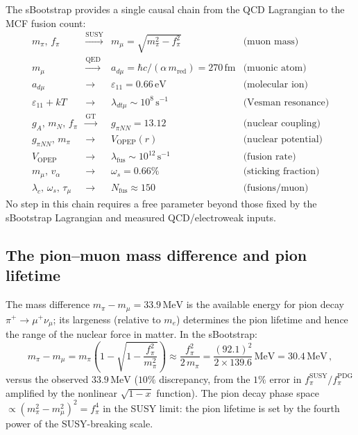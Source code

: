 \documentclass[12pt,a4paper]{article}
\newcommand{\MeV}{\,\text{MeV}}
\newcommand{\eV}{\,\text{eV}}
\newcommand{\fpi}{f_\pi}
\begin{document}
The sBootstrap provides a single causal chain from the QCD Lagrangian
to the MCF fusion count:
\begin{equation}
\begin{array}{rcll}
  m_\pi,\,\fpi & \xrightarrow{\text{SUSY}} & m_\mu = \sqrt{m_\pi^2 - \fpi^2}
    & \text{(muon mass)} \\
  m_\mu & \xrightarrow{\text{QED}} & a_{d\mu} = \hbar c/(\alpha\,m_{\text{red}})
    = 270\,\text{fm} & \text{(muonic atom)} \\
  a_{d\mu} & \to & \varepsilon_{11} = 0.66\eV
    & \text{(molecular ion)} \\
  \varepsilon_{11} + kT & \to & \lambda_{dt\mu} \sim 10^8\,\text{s}^{-1}
    & \text{(Vesman resonance)} \\
  g_A,\,m_N,\,\fpi & \xrightarrow{\text{GT}} & g_{\pi NN} = 13.12
    & \text{(nuclear coupling)} \\
  g_{\pi NN},\,m_\pi & \to & V_{\text{OPEP}}(r)
    & \text{(nuclear potential)} \\
  V_{\text{OPEP}} & \to & \lambda_{\text{fus}} \sim 10^{12}\,\text{s}^{-1}
    & \text{(fusion rate)} \\
  m_\mu,\,v_\alpha & \to & \omega_s = 0.66\%
    & \text{(sticking fraction)} \\
  \lambda_c,\,\omega_s,\,\tau_\mu & \to & N_{\text{fus}} \approx 150
    & \text{(fusions/muon)}
\end{array}
\end{equation}
No step in this chain requires a free parameter beyond those fixed by
the sBootstrap Lagrangian and measured QCD/electroweak inputs.

\subsection{The pion--muon mass difference and pion lifetime}

The mass difference $m_\pi - m_\mu = 33.9\MeV$ is the available
energy for pion decay $\pi^+ \to \mu^+ \nu_\mu$; its largeness
(relative to $m_e$) determines the pion lifetime and hence the
range of the nuclear force in matter.  In the sBootstrap:
\begin{equation}
  m_\pi - m_\mu
  = m_\pi\left(1 - \sqrt{1 - \frac{\fpi^2}{m_\pi^2}}\right)
  \approx \frac{\fpi^2}{2\,m_\pi}
  = \frac{(92.1)^2}{2 \times 139.6}\MeV
  = 30.4\MeV\,,
\end{equation}
versus the observed $33.9\MeV$ ($10\%$ discrepancy, from
the $1\%$ error in $\fpi^{\text{SUSY}}/\fpi^{\text{PDG}}$ amplified
by the nonlinear $\sqrt{1-x}$ function).  The pion decay phase space
$\propto (m_\pi^2 - m_\mu^2)^2 = \fpi^4$ in the SUSY limit:
the pion lifetime is set by the fourth power of the SUSY-breaking
scale.
\end{document}
